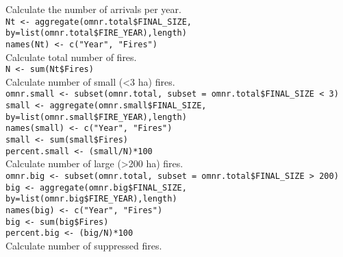 \begin{spacing}{1.5}
\noindent Calculate the number of arrivals per year. \\

\noindent \texttt{Nt <- aggregate(omnr.total\$FINAL\_SIZE, by=list(omnr.total\$FIRE\_YEAR),length)} \\

\noindent \texttt{names(Nt) <- c("Year", "Fires")} \\

\noindent Calculate total number of fires. \\

\noindent \texttt{N <- sum(Nt\$Fires)} \\

\noindent Calculate number of small (<3 ha) fires. \\

\noindent \texttt{omnr.small <- subset(omnr.total, subset = omnr.total\$FINAL\_SIZE < 3)} \\
                     
\noindent \texttt{small <- aggregate(omnr.small\$FINAL\_SIZE, by=list(omnr.small\$FIRE\_YEAR),length)} \\

\noindent \texttt{names(small) <- c("Year", "Fires")} \\

\noindent \texttt{small <- sum(small\$Fires)} \\

\noindent \texttt{percent.small <- (small/N)*100} \\

\noindent Calculate number of large (>200 ha) fires. \\

\noindent \texttt{omnr.big <- subset(omnr.total, subset = omnr.total\$FINAL\_SIZE > 200)} \\

\noindent \texttt{big <- aggregate(omnr.big\$FINAL\_SIZE, by=list(omnr.big\$FIRE\_YEAR),length)} \\

\noindent \texttt{names(big) <- c("Year", "Fires")} \\

\noindent \texttt{big <- sum(big\$Fires)} \\

\noindent \texttt{percent.big <- (big/N)*100} \\

\noindent Calculate number of suppressed fires. \\


\end{spacing}
